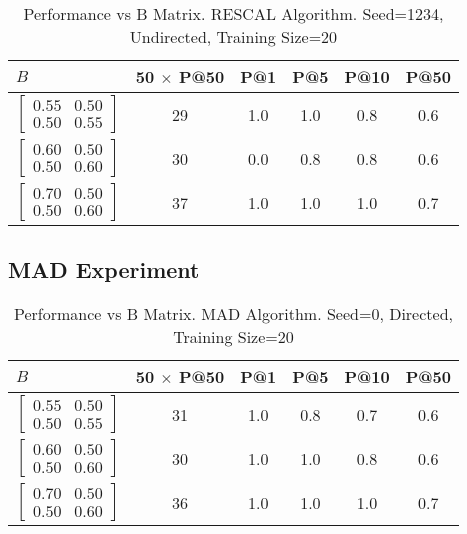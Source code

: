 \documentclass{tufte-handout}
\begin{document}
\begin{table}[!htbp]
  \begin{tabular}{l c c c c c}
    $B$ & 50 $\times$ P@50 & P@1 & P@5 & P@10 & P@50 \\ \toprule
  $\begin{bmatrix} 0.55 & 0.50 \\0.50 &0.55 \end{bmatrix}$ & 29 & 1.0 & 1.0 & 0.8 & 0.6 \\
  $\begin{bmatrix} 0.60 & 0.50 \\0.50 &0.60 \end{bmatrix}$ & 30 & 0.0 & 0.8 & 0.8 & 0.6 \\
  $\begin{bmatrix} 0.70 & 0.50 \\0.50 &0.60 \end{bmatrix}$ & 37 & 1.0 & 1.0 & 1.0 & 0.7 \\


  \end{tabular}
  \caption{Performance vs B Matrix. RESCAL Algorithm. Seed=1234, Undirected, Training Size=20}
  \label{tab:perf-vs-b}
\end{table}

\pagebreak
\subsection{MAD Experiment}
\label{sec:mad-experiment}
\begin{table}[htbp]
  \begin{tabular}{l c c c c c}
    $B$ & 50 $\times$ P@50 & P@1 & P@5 & P@10 & P@50 \\ \toprule
  $\begin{bmatrix} 0.55 & 0.50 \\0.50 &0.55 \end{bmatrix}$ & 31 & 1.0 & 0.8 & 0.7 & 0.6 \\
  $\begin{bmatrix} 0.60 & 0.50 \\0.50 &0.60 \end{bmatrix}$ & 30 & 1.0 & 1.0 & 0.8 & 0.6 \\
  $\begin{bmatrix} 0.70 & 0.50 \\0.50 &0.60 \end{bmatrix}$ & 36 & 1.0 & 1.0 & 1.0 & 0.7 \\
  \end{tabular}
  \caption{Performance vs B Matrix. MAD Algorithm. Seed=0, Directed, Training Size=20}
  \label{tab:perf-vs-b}
\end{table}
\end{document}
